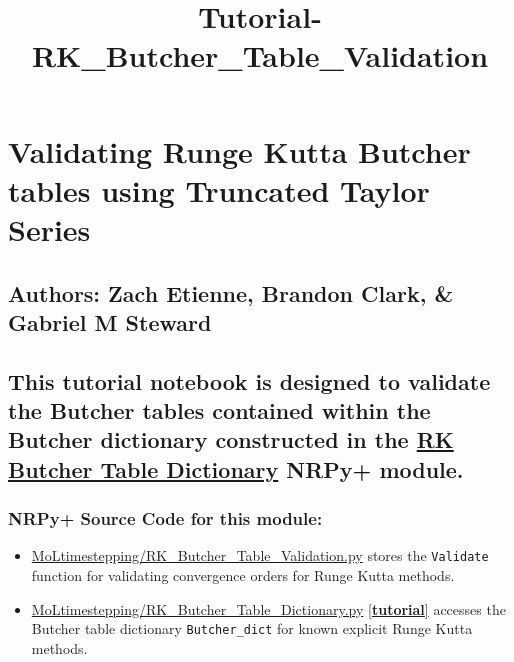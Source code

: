 \documentclass[landscape,letterpaper,10pt,english]{article}
\title{Tutorial-RK\_Butcher\_Table\_Validation}
\providecommand{\tightlist}{%
      \setlength{\itemsep}{0pt}\setlength{\parskip}{0pt}}
\begin{document}
    
    \maketitle
    
    

    
    \hypertarget{validating-runge-kutta-butcher-tables-using-truncated-taylor-series}{%
\section{Validating Runge Kutta Butcher tables using Truncated Taylor
Series}\label{validating-runge-kutta-butcher-tables-using-truncated-taylor-series}}

\hypertarget{authors-zach-etienne-brandon-clark-gabriel-m-steward}{%
\subsection{Authors: Zach Etienne, Brandon Clark, \& Gabriel M
Steward}\label{authors-zach-etienne-brandon-clark-gabriel-m-steward}}

\hypertarget{this-tutorial-notebook-is-designed-to-validate-the-butcher-tables-contained-within-the-butcher-dictionary-constructed-in-the-rk-butcher-table-dictionary-nrpy-module.}{%
\subsection{\texorpdfstring{This tutorial notebook is designed to
validate the Butcher tables contained within the Butcher dictionary
constructed in the \href{Tutorial-RK_Butcher_Table_Dictionary.ipynb}{RK
Butcher Table Dictionary} NRPy+
module.}{This tutorial notebook is designed to validate the Butcher tables contained within the Butcher dictionary constructed in the RK Butcher Table Dictionary NRPy+ module.}}\label{this-tutorial-notebook-is-designed-to-validate-the-butcher-tables-contained-within-the-butcher-dictionary-constructed-in-the-rk-butcher-table-dictionary-nrpy-module.}}

\hypertarget{nrpy-source-code-for-this-module}{%
\subsubsection{NRPy+ Source Code for this
module:}\label{nrpy-source-code-for-this-module}}

\begin{itemize}
\tightlist
\item
  \href{../edit/MoLtimestepping/RK_Butcher_Table_Validation.py}{MoLtimestepping/RK\_Butcher\_Table\_Validation.py}
  stores the \texttt{Validate} function for validating convergence
  orders for Runge Kutta methods.
\item
  \href{../edit/MoLtimestepping/RK_Butcher_Table_Dictionary.py}{MoLtimestepping/RK\_Butcher\_Table\_Dictionary.py}
  \href{Tutorial-RK_Butcher_Table_Dictionary.ipynb}{{[}\textbf{tutorial}{]}}
  accesses the Butcher table dictionary \texttt{Butcher\_dict} for known
  explicit Runge Kutta methods.
\end{itemize}
\end{document}
